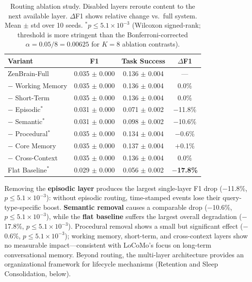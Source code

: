 \documentclass{article}
\begin{document}
\begin{table}[h]
    \caption{Routing ablation study. Disabled layers reroute content to the next
    available layer. $\Delta$F1 shows relative change vs.\ full system.
    Mean $\pm$ std over 10 seeds. $^\ast p \le 5.1\times 10^{-3}$ (Wilcoxon signed-rank;
    threshold is more stringent than the Bonferroni-corrected
    $\alpha=0.05/8=0.00625$ for $K=8$ ablation contrasts).}
    \label{tab:ablation}
    \centering
    \begin{tabular}{lccc}
        \toprule
        Variant & F1 & Task Success & $\Delta$F1 \\
        \midrule
        ZenBrain-Full & 0.035 $\pm$ 0.000 & 0.136 $\pm$ 0.004 & --- \\
        $-$ Working Memory & 0.035 $\pm$ 0.000 & 0.136 $\pm$ 0.004 & 0.0\% \\
        $-$ Short-Term & 0.035 $\pm$ 0.000 & 0.136 $\pm$ 0.004 & 0.0\% \\
        $-$ Episodic$^\ast$ & 0.031 $\pm$ 0.000 & 0.071 $\pm$ 0.002 & $-$11.8\% \\
        $-$ Semantic$^\ast$ & 0.031 $\pm$ 0.000 & 0.098 $\pm$ 0.002 & $-$10.6\% \\
        $-$ Procedural$^\ast$ & 0.035 $\pm$ 0.000 & 0.134 $\pm$ 0.004 & $-$0.6\% \\
        $-$ Core Memory & 0.035 $\pm$ 0.000 & 0.137 $\pm$ 0.004 & $+$0.1\% \\
        $-$ Cross-Context & 0.035 $\pm$ 0.000 & 0.136 $\pm$ 0.004 & 0.0\% \\
        Flat Baseline$^\ast$ & 0.029 $\pm$ 0.000 & 0.056 $\pm$ 0.002 & \textbf{$-$17.8\%} \\
        \bottomrule
    \end{tabular}
\end{table}

Removing the \textbf{episodic layer} produces the largest single-layer F1 drop
($-$11.8\%, $p \le 5.1\times 10^{-3}$): without episodic routing,
time-stamped events lose their query-type-specific boost.
\textbf{Semantic removal} causes a comparable drop ($-$10.6\%, $p \le 5.1\times 10^{-3}$),
while the \textbf{flat baseline} suffers the largest overall
degradation ($-$17.8\%, $p \le 5.1\times 10^{-3}$).
Procedural removal shows a small but significant effect ($-$0.6\%, $p \le 5.1\times 10^{-3}$);
working memory, short-term, and cross-context layers show no measurable
impact---consistent with LoCoMo's focus on long-term conversational memory.
Beyond routing, the multi-layer architecture provides an organizational
framework for lifecycle mechanisms (Retention and Sleep Consolidation, below).
\end{document}
